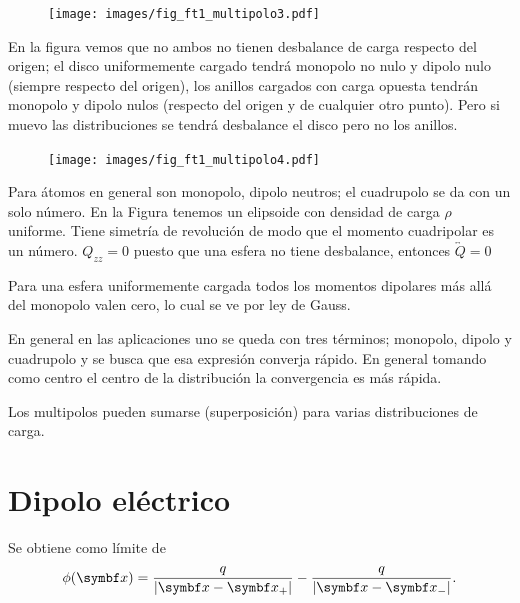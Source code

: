 \documentclass[10pt,oneside]{CBFT_book}
\begin{document}
\begin{figure}[htb]
	\begin{center}
	\texttt{[image: images/fig\_ft1\_multipolo3.pdf]}	 
	\end{center}
	\caption{}
\end{figure}

En la figura vemos que no ambos no tienen desbalance de carga respecto del origen; el disco uniformemente
cargado tendrá monopolo no nulo y dipolo nulo (siempre respecto del origen), los anillos cargados con carga
opuesta tendrán monopolo y dipolo nulos (respecto del origen y de cualquier otro punto). Pero si muevo las
distribuciones se tendrá desbalance el disco pero no los anillos.

\begin{figure}[htb]
	\begin{center}
	\texttt{[image: images/fig\_ft1\_multipolo4.pdf]}	 
	\end{center}
	\caption{}
\end{figure}

Para átomos en general son monopolo, dipolo neutros; el cuadrupolo se da con un solo número. 
En la Figura tenemos un elipsoide con densidad de carga $\rho$ uniforme. Tiene simetría de revolución
de modo que el momento cuadripolar es un número. $Q_{zz} = 0 $ puesto que una esfera no tiene
desbalance, entonces $\overleftrightarrow{Q} = 0 $ 

Para una esfera uniformemente cargada todos los momentos dipolares más allá del monopolo valen
cero, lo cual se ve por ley de Gauss.

En general en las aplicaciones uno se queda con tres términos; monopolo, dipolo y cuadrupolo y se
busca que esa expresión converja rápido. En general tomando como centro el centro de la distribución
la convergencia es más rápida.

Los multipolos pueden sumarse (superposición) para varias distribuciones de carga.


\section{Dipolo eléctrico}

Se obtiene como límite de 
\[
	\phi(\vb{x}) = \frac{ q }{| \vbx - \vbx_+ |}  - \frac{ q }{| \vbx - \vbx_- |}.
\]
\end{document}
